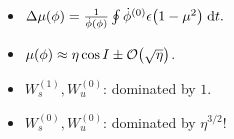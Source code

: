 \documentclass[dvipsnames, 11pt]{beamer}
\DeclarePairedDelimiter\p{\lparen}{\rparen}
\begin{document}
\begin{frame}
\begin{columns}
\begin{column}{0.5\textwidth}
\begin{itemize}
                \begin{itemize}
                    \item $\Delta \mu(\phi) = \frac{1}{\dot{\phi}(\phi)}
                            \oint \dot{\phi}^{(0)} \epsilon\p*{1 - \mu^2}
                                \;\mathrm{d}t.$
                    \item $\mu(\phi) \approx
                        \eta \cos I \pm \mathcal{O}\p*{\sqrt{\eta}}$.

                    \item $W_s^{(1)}, W_u^{(0)}$: dominated by $1$.

                    \item $W_s^{(0)}, W_u^{(0)}$: dominated by $\eta^{3/2}$!
                \end{itemize}
            \end{itemize}
        \end{column}
    \end{columns}
\end{frame}
\end{document}
